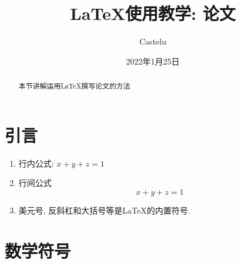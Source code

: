 \documentclass[a4paper, 11pt, UTF8]{article}
\title{\LaTeX 使用教学: 论文}
\author{Castelu}
\date{2022年1月25日}
\theoremstyle{plain}
\theoremstyle{definition}
\theoremstyle{remark}
\begin{document}
	\maketitle
	\begin{abstract}
		本节讲解运用\LaTeX 撰写论文的方法
	\end{abstract}

	\setcounter{section}{-1}
	
	
	\section{引言}
	
	\begin{enumerate}
		\item 行内公式: $x+y+z=1$
		
		\item 行间公式
		$$x+y+z=1$$
		
		\item 美元号, 反斜杠和大括号等是\LaTeX 的内置符号.		
	\end{enumerate}
	
	\section{数学符号}
	
\end{document}
